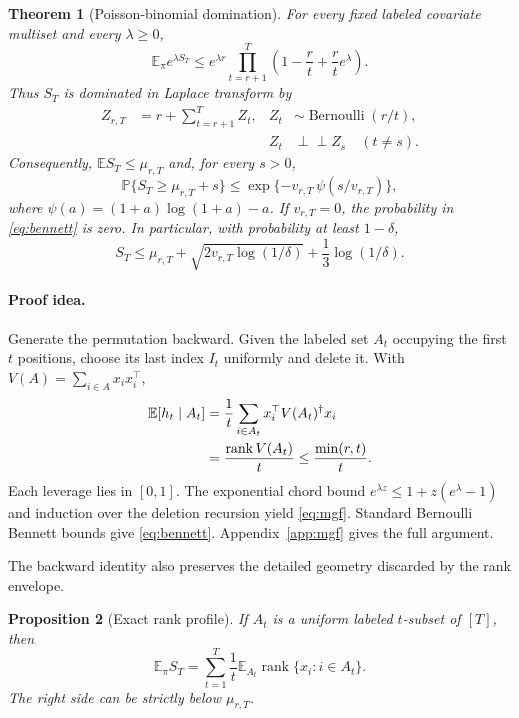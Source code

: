 \documentclass[twoside]{article}
\newtheorem{theorem}{Theorem}
\newtheorem{proposition}[theorem]{Proposition}
\newcommand{\E}{\mathbb E}
\newcommand{\Pp}{\mathbb P}
\newcommand{\rank}{\operatorname{rank}}
\begin{document}
\begin{theorem}[Poisson-binomial domination]
\label{thm:mgf}
For every fixed labeled covariate multiset and every $\lambda\ge0$,
\begin{equation}
 \E_\pi e^{\lambda S_T}
 \le e^{\lambda r}\prod_{t=r+1}^T
 \left(1-\frac rt+\frac rt e^\lambda\right).
 \label{eq:mgf}
\end{equation}
Thus $S_T$ is dominated in Laplace transform by
\begin{align*}
 Z_{r,T}&=r+\sum_{t=r+1}^TZ_t,
 &Z_t&\sim\operatorname{Bernoulli}(r/t),\\[-2pt]
 &&Z_t&\mathrel{\perp}\!\!\!\perp Z_s\quad(t\ne s).
\end{align*}
Consequently, $\E S_T\le\mu_{r,T}$ and, for every $s>0$,
\begin{equation}
 \Pp\{S_T\ge\mu_{r,T}+s\}
 \le \exp\{-v_{r,T}\,\psi(s/v_{r,T})\},
 \label{eq:bennett}
\end{equation}
where $\psi(a)=(1+a)\log(1+a)-a$. If $v_{r,T}=0$, the probability in \eqref{eq:bennett} is zero. In particular, with probability at least $1-\delta$,
\begin{equation}
 S_T\le\mu_{r,T}+\sqrt{2v_{r,T}\log(1/\delta)}
 +\frac13\log(1/\delta).
 \label{eq:bernstein}
\end{equation}
\end{theorem}

\paragraph{Proof idea.}
Generate the permutation backward. Given the labeled set $A_t$ occupying the first $t$ positions, choose its last index $I_t$ uniformly and delete it. With $V(A)=\sum_{i\in A}x_ix_i^\top$,
\begin{align}
 \E[h_t\mid A_t]
 &=\frac1t\sum_{i\in A_t}x_i^\top V(A_t)^\dagger x_i\notag\\
 &=\frac{\rank V(A_t)}t
 \le\frac{\min(r,t)}t.
 \label{eq:backward-mean}
\end{align}
Each leverage lies in $[0,1]$. The exponential chord bound
$e^{\lambda z}\le1+z(e^\lambda-1)$ and induction over the deletion recursion yield \eqref{eq:mgf}. Standard Bernoulli Bennett bounds give \eqref{eq:bennett}. Appendix~\ref{app:mgf} gives the full argument.

The backward identity also preserves the detailed geometry discarded by the rank envelope.

\begin{proposition}[Exact rank profile]
\label{prop:profile}
If $A_t$ is a uniform labeled $t$-subset of $[T]$, then
\begin{equation}
 \E_\pi S_T
 =\sum_{t=1}^T\frac1t
 \E_{A_t}\rank\{x_i:i\in A_t\}.
 \label{eq:profile}
\end{equation}
The right side can be strictly below $\mu_{r,T}$.
\end{proposition}
\end{document}
